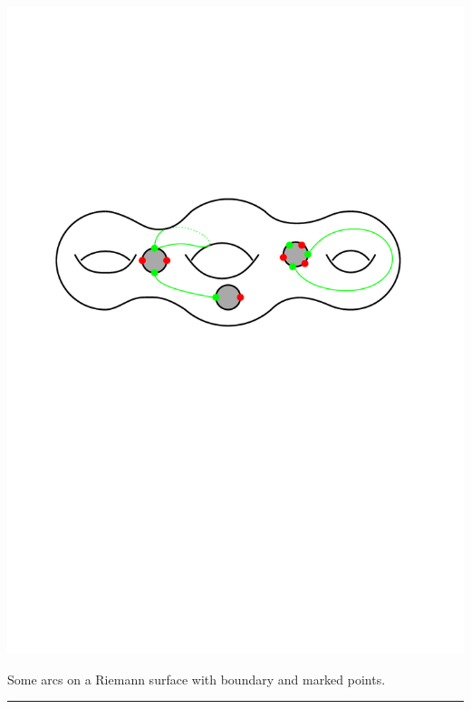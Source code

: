 \documentclass[portrait,final,a0paper,fontscale=0.25]{baposter}
\theoremstyle{definition}
\begin{document}
\begin{poster}
{%
\vspace*{-.1cm}
\includegraphics[scale=.35]{Surface}

\vspace*{-1.7cm}\hspace*{5.6cm}
\begin{minipage}{4cm}
{\footnotesize Some arcs on a Riemann surface with boundary and marked points.}
\end{minipage}

\vspace{.6cm}
\hspace{-.25cm}
{\color{blue} \rule{10.02cm}{1pt}}
\vspace{-.35cm}

}
\end{poster}
\end{document}
